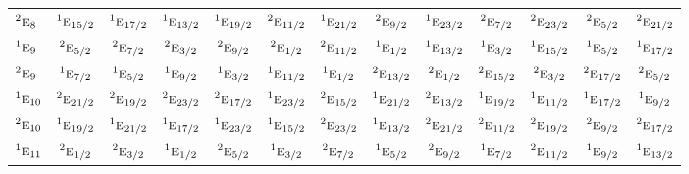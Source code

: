 \documentclass[10pt,a4paper]{article}
\numberwithin{equation}{section}
\newcommand{\irr}[1]{\text{\normalfont\scshape #1}}
\newcommand{\conjpair}[1]{{}^{#1}}
\begin{document}
{\begin{longtable}{@{}lcccccccccccc@{}}
$\conjpair{2}\irr{e}_{8}$ & $\conjpair{1}\irr{e}_{15/2}$ & $\conjpair{1}\irr{e}_{17/2}$ & $\conjpair{1}\irr{e}_{13/2}$ & $\conjpair{1}\irr{e}_{19/2}$ & $\conjpair{2}\irr{e}_{11/2}$ & $\conjpair{1}\irr{e}_{21/2}$ & $\conjpair{2}\irr{e}_{9/2}$ & $\conjpair{1}\irr{e}_{23/2}$ & $\conjpair{2}\irr{e}_{7/2}$ & $\conjpair{2}\irr{e}_{23/2}$ & $\conjpair{2}\irr{e}_{5/2}$ & $\conjpair{2}\irr{e}_{21/2}$\\
$\conjpair{1}\irr{e}_{9}$ & $\conjpair{2}\irr{e}_{5/2}$ & $\conjpair{2}\irr{e}_{7/2}$ & $\conjpair{2}\irr{e}_{3/2}$ & $\conjpair{2}\irr{e}_{9/2}$ & $\conjpair{2}\irr{e}_{1/2}$ & $\conjpair{2}\irr{e}_{11/2}$ & $\conjpair{1}\irr{e}_{1/2}$ & $\conjpair{1}\irr{e}_{13/2}$ & $\conjpair{1}\irr{e}_{3/2}$ & $\conjpair{1}\irr{e}_{15/2}$ & $\conjpair{1}\irr{e}_{5/2}$ & $\conjpair{1}\irr{e}_{17/2}$\\
$\conjpair{2}\irr{e}_{9}$ & $\conjpair{1}\irr{e}_{7/2}$ & $\conjpair{1}\irr{e}_{5/2}$ & $\conjpair{1}\irr{e}_{9/2}$ & $\conjpair{1}\irr{e}_{3/2}$ & $\conjpair{1}\irr{e}_{11/2}$ & $\conjpair{1}\irr{e}_{1/2}$ & $\conjpair{2}\irr{e}_{13/2}$ & $\conjpair{2}\irr{e}_{1/2}$ & $\conjpair{2}\irr{e}_{15/2}$ & $\conjpair{2}\irr{e}_{3/2}$ & $\conjpair{2}\irr{e}_{17/2}$ & $\conjpair{2}\irr{e}_{5/2}$\\
$\conjpair{1}\irr{e}_{10}$ & $\conjpair{2}\irr{e}_{21/2}$ & $\conjpair{2}\irr{e}_{19/2}$ & $\conjpair{2}\irr{e}_{23/2}$ & $\conjpair{2}\irr{e}_{17/2}$ & $\conjpair{1}\irr{e}_{23/2}$ & $\conjpair{2}\irr{e}_{15/2}$ & $\conjpair{1}\irr{e}_{21/2}$ & $\conjpair{2}\irr{e}_{13/2}$ & $\conjpair{1}\irr{e}_{19/2}$ & $\conjpair{1}\irr{e}_{11/2}$ & $\conjpair{1}\irr{e}_{17/2}$ & $\conjpair{1}\irr{e}_{9/2}$\\
$\conjpair{2}\irr{e}_{10}$ & $\conjpair{1}\irr{e}_{19/2}$ & $\conjpair{1}\irr{e}_{21/2}$ & $\conjpair{1}\irr{e}_{17/2}$ & $\conjpair{1}\irr{e}_{23/2}$ & $\conjpair{1}\irr{e}_{15/2}$ & $\conjpair{2}\irr{e}_{23/2}$ & $\conjpair{1}\irr{e}_{13/2}$ & $\conjpair{2}\irr{e}_{21/2}$ & $\conjpair{2}\irr{e}_{11/2}$ & $\conjpair{2}\irr{e}_{19/2}$ & $\conjpair{2}\irr{e}_{9/2}$ & $\conjpair{2}\irr{e}_{17/2}$\\
$\conjpair{1}\irr{e}_{11}$ & $\conjpair{2}\irr{e}_{1/2}$ & $\conjpair{2}\irr{e}_{3/2}$ & $\conjpair{1}\irr{e}_{1/2}$ & $\conjpair{2}\irr{e}_{5/2}$ & $\conjpair{1}\irr{e}_{3/2}$ & $\conjpair{2}\irr{e}_{7/2}$ & $\conjpair{1}\irr{e}_{5/2}$ & $\conjpair{2}\irr{e}_{9/2}$ & $\conjpair{1}\irr{e}_{7/2}$ & $\conjpair{2}\irr{e}_{11/2}$ & $\conjpair{1}\irr{e}_{9/2}$ & $\conjpair{1}\irr{e}_{13/2}$\\

\end{longtable}}
\end{document}
